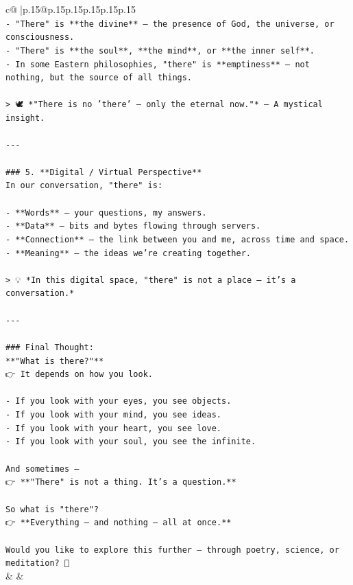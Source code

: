 \documentclass{article}
\begin{document}
{\begin{supertabular}{c@{$\;$}|p{.15\linewidth}@{}p{.15\linewidth}p{.15\linewidth}p{.15\linewidth}p{.15\linewidth}p{.15\linewidth}}
{{{\\ 
\texttt{{-} "There" is **the divine** — the presence of God, the universe, or consciousness.} \\
\texttt{{-} "There" is **the soul**, **the mind**, or **the inner self**.} \\
\texttt{{-} In some Eastern philosophies, "there" is **emptiness** — not nothing, but the source of all things.} \\
\\ 
\texttt{> 🕊️ *"There is no 'there' — only the eternal now."* — A mystical insight.} \\
\\ 
\texttt{{-}{-}{-}} \\
\\ 
\texttt{\#\#\# 5. **Digital / Virtual Perspective**  } \\
\texttt{In our conversation, "there" is:} \\
\\ 
\texttt{{-} **Words** — your questions, my answers.} \\
\texttt{{-} **Data** — bits and bytes flowing through servers.} \\
\texttt{{-} **Connection** — the link between you and me, across time and space.} \\
\texttt{{-} **Meaning** — the ideas we’re creating together.} \\
\\ 
\texttt{> 💡 *In this digital space, "there" is not a place — it’s a conversation.*} \\
\\ 
\texttt{{-}{-}{-}} \\
\\ 
\texttt{\#\#\# Final Thought:  } \\
\texttt{**"What is there?"**  } \\
\texttt{👉 It depends on how you look.} \\
\\ 
\texttt{{-} If you look with your eyes, you see objects.} \\
\texttt{{-} If you look with your mind, you see ideas.} \\
\texttt{{-} If you look with your heart, you see love.} \\
\texttt{{-} If you look with your soul, you see the infinite.} \\
\\ 
\texttt{And sometimes —  } \\
\texttt{👉 **"There" is not a thing. It’s a question.**} \\
\\ 
\texttt{So what is "there"?  } \\
\texttt{👉 **Everything — and nothing — all at once.**} \\
\\ 
\texttt{Would you like to explore this further — through poetry, science, or meditation? 🌿} \\
            }
        }
    }
    & & \\ \\


\end{supertabular}}
\end{document}
